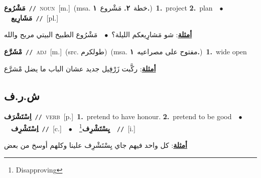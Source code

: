 \documentclass[10pt,a4paper,twoside]{article} %
\begin{document}
\begin{multicols}{2}
{\setlength\topsep{0pt}\textbf{\foreignlanguage{arabic}{مَشْرُوع}}\ {\color{gray}\texttt{//}\color{black}}\ \textsc{noun}\ [m.]\ \color{gray}(msa. \foreignlanguage{arabic}{خطة}~\foreignlanguage{arabic}{\textbf{٢.}}  \foreignlanguage{arabic}{مَشْروع}~\foreignlanguage{arabic}{\textbf{١.}})\color{black}\ \textbf{1.}~project  \textbf{2.}~plan\ \ $\bullet$\ \ \setlength\topsep{0pt}\textbf{\foreignlanguage{arabic}{مَشَارِيع}}\ {\color{gray}\texttt{//}\color{black}}\ [pl.]\  \begin{flushright}\color{gray}\foreignlanguage{arabic}{\textbf{\underline{\foreignlanguage{arabic}{أمثلة}}}: شو مَشارِِيعكم الليلة؟\ $\bullet$\ \  مَشْرُوع الطبيخ البيتي مربح والله}\end{flushright}\color{black}} \vspace{2mm}

{\setlength\topsep{0pt}\textbf{\foreignlanguage{arabic}{مْشَرَّع}}\ {\color{gray}\texttt{//}\color{black}}\ \textsc{adj}\ [m.]\ (src. \color{gray}\foreignlanguage{arabic}{طولكرم}\color{black})\ \color{gray}(msa. \foreignlanguage{arabic}{مفتوح على مصراعيه}~\foreignlanguage{arabic}{\textbf{١.}})\color{black}\ \textbf{1.}~wide open\  \begin{flushright}\color{gray}\foreignlanguage{arabic}{\textbf{\underline{\foreignlanguage{arabic}{أمثلة}}}: ركَّبت زَرْفِيل جديد عشان الباب ما يضل مْشرَّع}\end{flushright}\color{black}} \vspace{2mm}

\vspace{-3mm}
\subsection*{\color{blue}\foreignlanguage{arabic}{ش.ر.ف}\color{blue}{}} 

{\setlength\topsep{0pt}\textbf{\foreignlanguage{arabic}{اِسْتَشْرَف}}\ {\color{gray}\texttt{//}\color{black}}\ \textsc{verb}\ [p.]\ \textbf{1.}~pretend to have honour.  \textbf{2.}~pretend to be good\ \ $\bullet$\ \ \setlength\topsep{0pt}\textbf{\foreignlanguage{arabic}{اِسْتَشْرِف}}\ {\color{gray}\texttt{//}\color{black}}\ [c.]\ \ $\bullet$\ \ \setlength\topsep{0pt}\textbf{\foreignlanguage{arabic}{يِسْتَشْرِف}}\footnote{Disapproving}\ \ {\color{gray}\texttt{//}\color{black}}\ [i.]\  \begin{flushright}\color{gray}\foreignlanguage{arabic}{\textbf{\underline{\foreignlanguage{arabic}{أمثلة}}}: كل واحد فيهم جاي يِسْتَشْرِف علينا وكلهم أوسخ من بعض}\end{flushright}\color{black}} \vspace{2mm}


\end{multicols}
\end{document}
